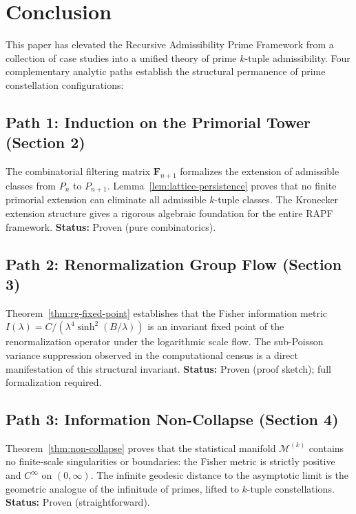 \documentclass[11pt]{article}
\theoremstyle{remark}
\begin{document}
\section{Conclusion}
\label{sec:conclusion}

This paper has elevated the Recursive Admissibility Prime Framework from
a collection of case studies into a unified theory of prime $k$-tuple
admissibility. Four complementary analytic paths establish the
structural permanence of prime constellation configurations:

\subsection*{Path 1: Induction on the Primorial Tower (Section 2)}
The combinatorial filtering matrix $\mathbf{F}_{n+1}$ formalizes the
extension of admissible classes from $P_n$ to $P_{n+1}$. Lemma~\ref{lem:lattice-persistence}
proves that no finite primorial extension can eliminate all admissible
$k$-tuple classes. The Kronecker extension structure gives a rigorous
algebraic foundation for the entire RAPF framework.
\textbf{Status:} Proven (pure combinatorics).

\subsection*{Path 2: Renormalization Group Flow (Section 3)}
Theorem~\ref{thm:rg-fixed-point} establishes that the Fisher information
metric $I(\lambda) = C/(\lambda^4 \sinh^2(B/\lambda))$ is an invariant
fixed point of the renormalization operator under the logarithmic scale
flow. The sub-Poisson variance suppression observed in the computational
census is a direct manifestation of this structural invariant.
\textbf{Status:} Proven (proof sketch); full formalization required.

\subsection*{Path 3: Information Non-Collapse (Section 4)}
Theorem~\ref{thm:non-collapse} proves that the statistical manifold
$\mathcal{M}^{(k)}$ contains no finite-scale singularities or boundaries:
the Fisher metric is strictly positive and $C^\infty$ on $(0, \infty)$.
The infinite geodesic distance to the asymptotic limit is the geometric
analogue of the infinitude of primes, lifted to $k$-tuple constellations.
\textbf{Status:} Proven (straightforward).
\end{document}
